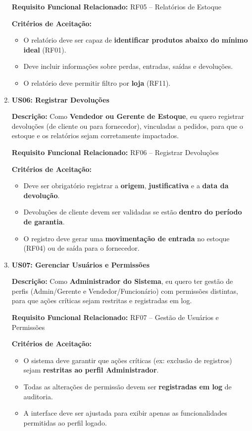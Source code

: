 \documentclass[
	12pt,				%
	openany,			%
	twoside,			%
	a4paper,			%
	english,			%
	brazil				%
	]{abntex2}
\begin{document}
\begin{enumerate}
\textbf{Requisito Funcional Relacionado:} RF05 -- Relatórios de Estoque

\textbf{Crit\'erios de Aceita\c{c}\~ao:}
\begin{itemize}
  \item O relatório deve ser capaz de \textbf{identificar produtos abaixo do mínimo ideal} (RF01).
  \item Deve incluir informações sobre perdas, entradas, saídas e devoluções.
  \item O relatório deve permitir filtro por \textbf{loja} (RF11).
\end{itemize}

\item \textbf{US06: Registrar Devoluções}

\textbf{Descri\c{c}\~ao:} Como \textbf{Vendedor ou Gerente de Estoque}, eu quero registrar devoluções (de cliente ou para fornecedor), vinculadas a pedidos, para que o estoque e os relatórios sejam corretamente impactados.

\textbf{Requisito Funcional Relacionado:} RF06 -- Registrar Devoluções

\textbf{Crit\'erios de Aceita\c{c}\~ao:}
\begin{itemize}
  \item Deve ser obrigatório registrar a \textbf{origem}, \textbf{justificativa} e a \textbf{data da devolução}.
  \item Devoluções de cliente devem ser validadas se estão \textbf{dentro do período de garantia}.
  \item O registro deve gerar uma \textbf{movimentação de entrada} no estoque (RF04) ou de saída para o fornecedor.
\end{itemize}

\item \textbf{US07: Gerenciar Usuários e Permissões}

\textbf{Descri\c{c}\~ao:} Como \textbf{Administrador do Sistema}, eu quero ter gestão de perfis (Admin/Gerente e Vendedor/Funcionário) com permissões distintas, para que ações críticas sejam restritas e registradas em log.

\textbf{Requisito Funcional Relacionado:} RF07 -- Gestão de Usuários e Permissões

\textbf{Crit\'erios de Aceita\c{c}\~ao:}
\begin{itemize}
  \item O sistema deve garantir que ações críticas (ex: exclusão de registros) sejam \textbf{restritas ao perfil Administrador}.
  \item Todas as alterações de permissão devem ser \textbf{registradas em log} de auditoria.
  \item A interface deve ser ajustada para exibir apenas as funcionalidades permitidas ao perfil logado.
\end{itemize}


\end{enumerate}
\end{document}
